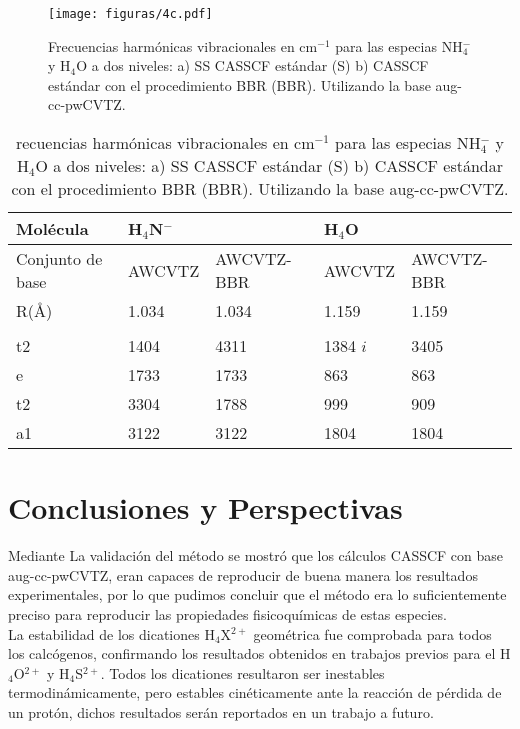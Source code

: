 \documentclass[12pt]{report}
\begin{document}
\begin{figure}[h]
\centering
\texttt{[image: figuras/4c.pdf]} 
\caption{Frecuencias harmónicas vibracionales en cm$^{-1}$ para las especias NH$_4^-$ y H$_4$O a dos niveles:  a) SS CASSCF estándar (S) b) CASSCF estándar con el procedimiento BBR (BBR). Utilizando la base aug-cc-pwCVTZ.}
\label{neutras}
\end{figure}

\begin{table}[h]
\centering
\begin{tabular}{l|ll|ll}
\hline
Molécula &    H$_4$N$^-$ &  &    H$_4$O &  \\ \hline
Conjunto de base &  \multicolumn{1}{l|}{AWCVTZ} & AWCVTZ-BBR  & \multicolumn{1}{l|}{AWCVTZ} & AWCVTZ-BBR \\ \hline
R(\AA) & \multicolumn{1}{l|}{1.034} & 1.034 & \multicolumn{1}{l|}{1.159} & 1.159 \\
 & \multicolumn{1}{l|}{} &  & \multicolumn{1}{l|}{} &  \\
t2 & \multicolumn{1}{l|}{1404} & 4311 & \multicolumn{1}{l|}{1384 $i$} &  3405 \\
e & \multicolumn{1}{l|}{1733} & 1733 & \multicolumn{1}{l|}{863} & 863 \\
t2 & \multicolumn{1}{l|}{3304} & 1788 & \multicolumn{1}{l|}{999} & 909 \\
a1 & \multicolumn{1}{l|}{3122} & 3122 & \multicolumn{1}{l|}{1804} & 1804 \\ \hline
\end{tabular}
\caption{recuencias harmónicas vibracionales en cm$^{-1}$ para las especias NH$_4^-$ y H$_4$O a dos niveles:  a) SS CASSCF estándar (S) b) CASSCF estándar con el procedimiento BBR (BBR). Utilizando la base aug-cc-pwCVTZ.}
\label{neutrast}
\end{table}

\newpage
\chapter{Conclusiones y Perspectivas}

Mediante La validación del método se mostró que los cálculos CASSCF con base aug-cc-pwCVTZ, eran capaces de reproducir de buena manera los resultados experimentales, por lo que pudimos concluir que el método era lo suficientemente preciso para reproducir las propiedades fisicoquímicas de estas especies. 
\\


La estabilidad de los dicationes H$_4$X$^{2+}$ geométrica fue comprobada para todos los calcógenos, confirmando los resultados obtenidos en trabajos previos para el H$_4$O$^{2+}$ y H$_4$S$^{2+}$. Todos los dicationes resultaron ser inestables termodinámicamente, pero estables cinéticamente ante la reacción de pérdida de un protón, dichos resultados serán reportados en un trabajo a futuro.
\\
\end{document}
